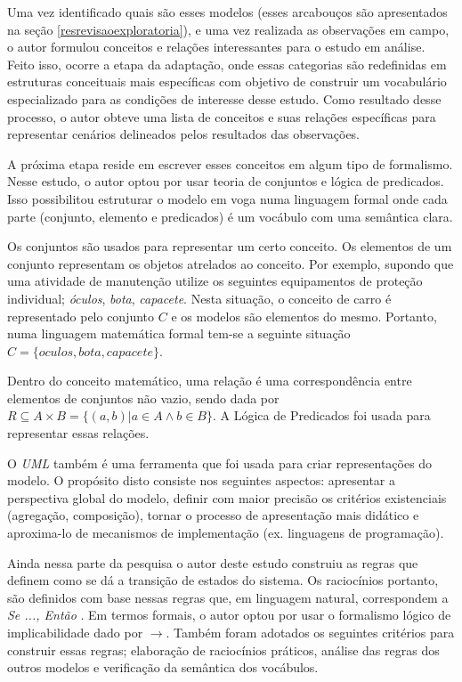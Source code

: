 Uma vez identificado quais são esses modelos (esses arcabouços são apresentados na seção \ref{resrevisaoexploratoria}), e uma vez realizada as observações em campo, o autor formulou conceitos e relações interessantes para o estudo em análise. Feito isso, ocorre a etapa da adaptação, onde essas categorias são redefinidas em estruturas conceituais mais específicas com objetivo de construir um vocabulário especializado para as condições de interesse desse estudo. Como resultado desse processo, o autor obteve uma lista de conceitos e suas relações específicas para representar cenários delineados pelos resultados das observações. 

A próxima etapa reside em escrever esses conceitos em algum tipo de formalismo. Nesse estudo, o autor optou por usar teoria de conjuntos e lógica de predicados. Isso possibilitou estruturar o modelo em voga numa linguagem formal onde cada parte (conjunto, elemento e predicados) é um vocábulo com uma semântica clara. 

Os conjuntos são usados para representar um certo conceito. Os elementos de um conjunto representam os objetos atrelados ao conceito. Por exemplo, supondo que uma atividade de manutenção utilize os seguintes equipamentos de proteção individual; \textit{óculos}, \textit{bota}, \textit{capacete}.
Nesta situação, o conceito de carro é representado pelo conjunto $C$ e os modelos são elementos do mesmo. Portanto, numa linguagem matemática formal tem-se a seguinte situação $C = \{oculos,bota,capacete\}$. 

Dentro do conceito matemático, uma relação é uma correspondência entre elementos de conjuntos não vazio, sendo dada por $R \subseteq  A \times B = \{(a,b)| a \in A \wedge b \in B \}$. A Lógica de Predicados foi usada para representar essas
relações.

O \textit{UML} também é uma ferramenta que foi usada para criar representações do modelo. O propósito disto consiste nos seguintes aspectos: apresentar a perspectiva global do modelo, definir com maior precisão os critérios existenciais (agregação, composição), tornar o processo de apresentação mais didático e aproxima-lo de mecanismos de implementação (ex. linguagens de programação). 

Ainda nessa parte da pesquisa o autor deste estudo construiu as regras que definem como se dá a transição de estados do sistema. Os raciocínios portanto, são definidos com base nessas regras que, em linguagem natural, correspondem a \textit{Se ..., Então }. Em termos formais, o autor optou por usar o formalismo lógico de implicabilidade dado por $\to$. Também foram adotados os seguintes critérios para construir essas regras; elaboração de raciocínios práticos, análise das regras dos outros modelos e verificação da semântica dos vocábulos.